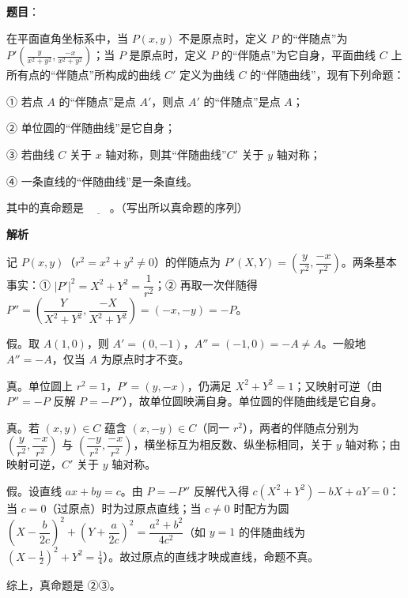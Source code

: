 \begin{answer}

\textbf{题目}：

在平面直角坐标系中，当 \(P(x,y)\) 不是原点时，定义 \(P\) 的“伴随点”为 \(P'\left(\frac{y}{x^{2}+y^{2}},\frac{-x}{x^{2}+y^{2}}\right)\)；当 \(P\) 是原点时，定义 \(P\) 的“伴随点”为它自身，平面曲线 \(C\) 上所有点的“伴随点”所构成的曲线 \(C'\) 定义为曲线 \(C\) 的“伴随曲线”，现有下列命题：

① 若点 \(A\) 的“伴随点”是点 \(A'\)，则点 \(A'\) 的“伴随点”是点 \(A\)；

② 单位圆的“伴随曲线”是它自身；

③ 若曲线 \(C\) 关于 \(x\) 轴对称，则其“伴随曲线”\(C'\) 关于 \(y\) 轴对称；

④ 一条直线的“伴随曲线”是一条直线。

其中的真命题是 \(\underline{\qquad}\)。（写出所以真命题的序列）

\textbf{解析}

记 \(P(x,y)\)（\(r^{2}=x^{2}+y^{2}\neq0\)）的伴随点为 \(P'(X,Y)=\left(\dfrac{y}{r^{2}},\dfrac{-x}{r^{2}}\right)\)。两条基本事实：① \(|P'|^{2}=X^{2}+Y^{2}=\dfrac{1}{r^{2}}\)；② 再取一次伴随得 \(P''=\left(\dfrac{Y}{X^{2}+Y^{2}},\dfrac{-X}{X^{2}+Y^{2}}\right)=(-x,-y)=-P\)。


假。取 \(A(1,0)\)，则 \(A'=(0,-1)\)，\(A''=(-1,0)=-A\neq A\)。一般地 \(A''=-A\)，仅当 \(A\) 为原点时才不变。


真。单位圆上 \(r^{2}=1\)，\(P'=(y,-x)\)，仍满足 \(X^{2}+Y^{2}=1\)；又映射可逆（由 \(P''=-P\) 反解 \(P=-P''\)），故单位圆映满自身。单位圆的伴随曲线是它自身。


真。若 \((x,y)\in C\) 蕴含 \((x,-y)\in C\)（同一 \(r^{2}\)），两者的伴随点分别为 \(\left(\dfrac{y}{r^{2}},\dfrac{-x}{r^{2}}\right)\) 与 \(\left(\dfrac{-y}{r^{2}},\dfrac{-x}{r^{2}}\right)\)，横坐标互为相反数、纵坐标相同，关于 \(y\) 轴对称；由映射可逆，\(C'\) 关于 \(y\) 轴对称。


假。设直线 \(ax+by=c\)。由 \(P=-P''\) 反解代入得 \(c(X^{2}+Y^{2})-bX+aY=0\)：当 \(c=0\)（过原点）时为过原点直线；当 \(c\neq0\) 时配方为圆 \(\left(X-\dfrac{b}{2c}\right)^{2}+\left(Y+\dfrac{a}{2c}\right)^{2}=\dfrac{a^{2}+b^{2}}{4c^{2}}\)（如 \(y=1\) 的伴随曲线为 \((X-\tfrac{1}{2})^{2}+Y^{2}=\tfrac{1}{4}\)）。故过原点的直线才映成直线，命题不真。

综上，真命题是 ②③。


\end{answer}
